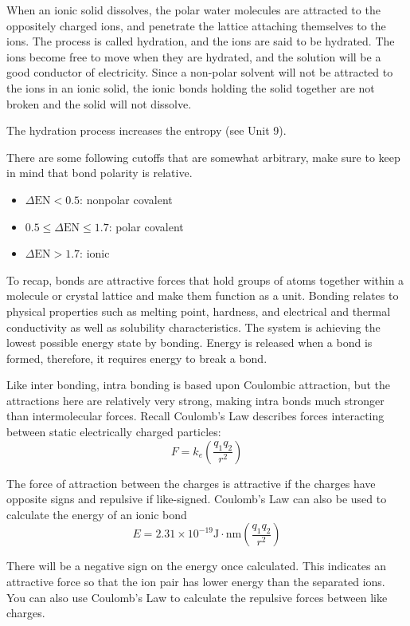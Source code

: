 \documentclass[../chem.tex]{subfiles}
\begin{document}
When an ionic solid dissolves, the polar water molecules are attracted to the oppositely charged ions, and penetrate the lattice attaching themselves to the ions.
The process is called hydration, and the ions are said to be hydrated. The ions become free to move when they are hydrated, and the solution will 
be a good conductor of electricity. Since a non-polar solvent will not be attracted to the ions in an ionic solid, the ionic bonds holding the solid 
together are not broken and the solid will not dissolve.

The hydration process increases the entropy (see Unit 9).

There are some following cutoffs that are somewhat arbitrary, make sure to keep in mind that bond polarity is relative.
\begin{itemize}
    \item $\Delta\text{EN}<0.5$: nonpolar covalent 
    \item $0.5\leq \Delta\text{EN}\leq 1.7$: polar covalent 
    \item $\Delta\text{EN}>1.7$: ionic
\end{itemize}

To recap, bonds are attractive forces that hold groups of atoms together within a molecule or crystal lattice and make them function as a unit.
Bonding relates to physical properties such as melting point, hardness, and electrical and thermal conductivity as well as solubility characteristics.
The system is achieving the lowest possible energy state by bonding. Energy is released when a bond is formed, therefore, it requires energy to break a bond.

Like inter bonding, intra bonding is based upon Coulombic attraction, but the attractions here are relatively very strong, making intra bonds much stronger than intermolecular forces. 
Recall Coulomb's Law describes forces interacting between static electrically charged particles:
\[F=k_e\left(\frac{q_1q_2}{r^2}\right)\]

The force of attraction between the charges is attractive if the charges have opposite signs and repulsive if like-signed. Coulomb's Law 
can also be used to calculate the energy of an ionic bond 
\[E=2.31\times10^{-19}\text{J}\cdot\text{nm}\left(\frac{q_1q_2}{r^2}\right)\]

There will be a negative sign on the energy once calculated. This indicates an attractive force so that the ion pair has lower energy 
than the separated ions. You can also use Coulomb's Law to calculate the repulsive forces between like charges.
\end{document}
